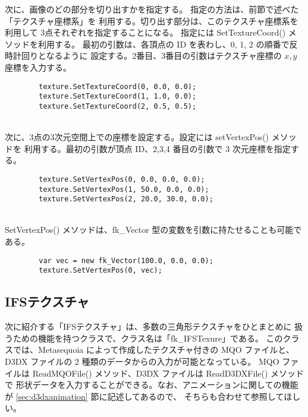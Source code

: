次に、画像のどの部分を切り出すかを指定する。
指定の方法は、前節で述べた「テクスチャ座標系」を
利用する。切り出す部分は、このテクスチャ座標系を利用して
3点それぞれを指定することになる。
指定には SetTextureCoord() メソッドを利用する。
最初の引数は、各頂点の ID を表わし、0, 1, 2 の順番で反時計回りとなるように
設定する。2番目、3番目の引数はテクスチャ座標の \(x, y\) 座標を入力する。
\\
\begin{screen}
\begin{verbatim}
        texture.SetTextureCoord(0, 0.0, 0.0);
        texture.SetTextureCoord(1, 1.0, 0.0);
        texture.SetTextureCoord(2, 0.5, 0.5);
\end{verbatim}
\end{screen}
~ \\
次に、3点の3次元空間上での座標を設定する。設定には setVertexPos() メソッドを
利用する。最初の引数が頂点 ID、2,3,4 番目の引数で 3 次元座標を指定する。
\\
\begin{screen}
\begin{verbatim}
        texture.SetVertexPos(0, 0.0, 0.0, 0.0);
        texture.SetVertexPos(1, 50.0, 0.0, 0.0);
        texture.SetVertexPos(2, 20.0, 30.0, 0.0);
\end{verbatim}
\end{screen}
~ \\
SetVertexPos() メソッドは、fk\_Vector 型の変数を引数に持たせることも可能である。
\\
\begin{screen}
\begin{verbatim}
        var vec = new fk_Vector(100.0, 0.0, 0.0);
        texture.SetVertexPos(0, vec);
\end{verbatim}
\end{screen}

\subsection{IFSテクスチャ} \label{subsec:ifstexture}
次に紹介する「IFSテクスチャ」は、多数の三角形テクスチャをひとまとめに
扱うための機能を持つクラスで、クラス名は「fk\_IFSTexure」である。
このクラスでは、Metasequoia によって作成したテクスチャ付きの MQO ファイルと、
D3DX ファイルの 2 種類のデータからの入力が可能となっている。
MQO ファイルは ReadMQOFile() メソッド、D3DX ファイルは ReadD3DXFile() メソッドで
形状データを入力することができる。なお、アニメーションに関しての機能が
\ref{sec:d3dxanimation} 節に記述してあるので、
そちらも合わせて参照してほしい。

